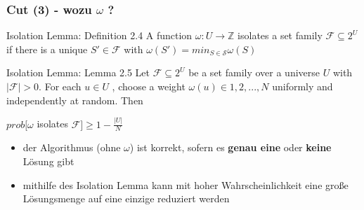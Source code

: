 \documentclass{beamer}
\begin{document}
\begin{frame}
\frametitle{Cut (3) - wozu $\omega$ ?}
\pause
\begin{block}{Isolation Lemma: Definition 2.4}
A function $\omega : U \rightarrow \mathbb{Z}$ isolates a set family $\mathcal{F} \subseteq 2^U$ if there is a unique $S' \in \mathcal{F}$ with $\omega (S')=min_{S \in \mathcal{S}} \omega(S)$
\end{block}
\pause
\begin{block}{Isolation Lemma: Lemma 2.5}
Let $\mathcal{F} \subseteq 2^U$ be a set family over a universe $U$ with $|\mathcal{F}| > 0$. For each $u \in U$ ,
choose a weight $\omega(u) \in {1, 2, . . . , N }$ uniformly and independently at random. Then
\begin{center}
$prob[\omega$ isolates $\mathcal{F}]\geq 1 - \frac{|U|}{N}$
\end{center}
\end{block}
\begin{itemize}
\pause
\item der Algorithmus (ohne $\omega$) ist korrekt, sofern es \textbf{genau eine} oder \textbf{keine} Lösung gibt
\pause
\item mithilfe des Isolation Lemma kann mit hoher Wahrscheinlichkeit eine große Lösungsmenge auf eine einzige reduziert werden
\end{itemize}

\end{frame}
\end{document}
